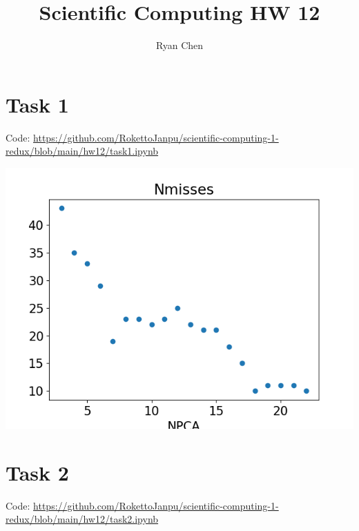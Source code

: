 \documentclass{article}
\title{Scientific Computing HW 12}
\author{Ryan Chen}
\begin{document}
	
\maketitle



\section*{Task 1}

Code: \url{https://github.com/RokettoJanpu/scientific-computing-1-redux/blob/main/hw12/task1.ipynb}

\begin{center}
	\includegraphics[scale=.5]{task1 misses}
\end{center}



\section*{Task 2}

Code: \url{https://github.com/RokettoJanpu/scientific-computing-1-redux/blob/main/hw12/task2.ipynb}
\end{document}
